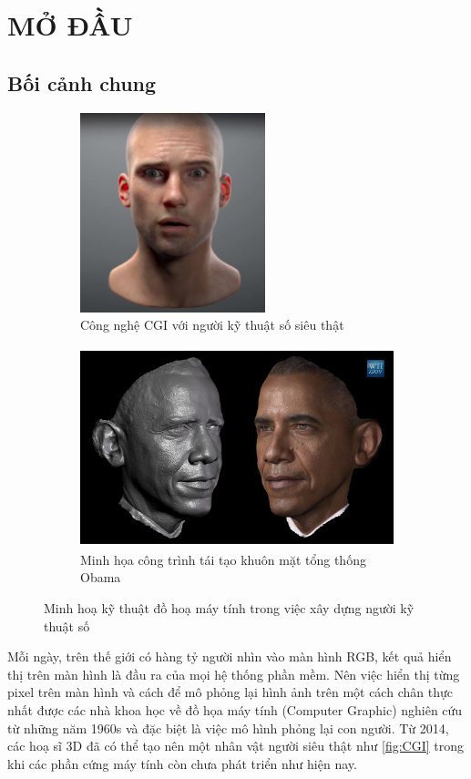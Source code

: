 
\chapter{MỞ ĐẦU}
\label{Introduction}

\section{Bối cảnh chung}


\begin{figure}[htbp]
	\centering
	\begin{subfigure}{0.35\textwidth}
		\centering
		\includegraphics[height=5.8cm]{images/cgi}
		 \caption{\small Công nghệ CGI với người kỹ thuật số siêu thật \cite{edchrisjones}}
		\label{fig:CGI}
	\end{subfigure}
	\hfill
	\begin{subfigure}{0.6\textwidth}
		\centering
		\includegraphics[height=5.8cm]{images/obama_scan}
		\caption{\small Minh họa công trình tái tạo khuôn mặt tổng thống Obama \cite{metallo2015scanning}}
		\label{fig:obamascan}
	\end{subfigure}
	\caption{Minh hoạ kỹ thuật đồ hoạ máy tính trong việc xây dựng người kỹ thuật số}
	\label{fig:DigitalHuman}
\end{figure}

Mỗi ngày, trên thế giới có hàng tỷ người nhìn vào màn hình RGB, kết quả hiển thị trên màn hình là đầu ra của mọi hệ thống phần mềm. Nên việc hiển thị từng pixel trên màn hình và cách để mô phỏng lại hình ảnh trên một cách chân thực nhất được các nhà khoa học về đồ họa máy tính (Computer Graphic) nghiên cứu từ những năm 1960s và đặc biệt là việc mô hình phỏng lại con người. Từ 2014, các hoạ sĩ 3D đã có thể tạo nên một nhân vật người siêu thật như \autoref{fig:CGI} trong khi các phần cứng máy tính còn chưa phát triển như hiện nay. 

